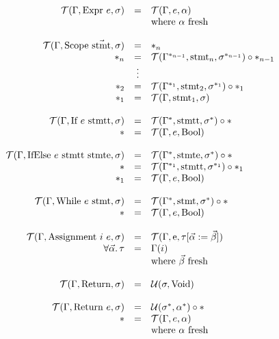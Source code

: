 \documentclass[11pt]{amsart}
\begin{document}
$\begin{array}{rcl}
	\T(\Gamma, \mbox{Expr}~e, \sigma) & = & \T(\Gamma, e, \alpha) \\
	& & \mbox{where}~\alpha~\mbox{fresh} \\

	\\

	\T(\Gamma, \mbox{Scope}~\vec{\mbox{stmt}}, \sigma) & = & \sn{n} \\
	\sn{n} & = & \T(\Gamma^{\sn{n-1}}, \mbox{stmt}_n, \sigma^{\sn{n-1}}) \circ \sn{n-1} \\
	& \vdots & \\
	\sn{2} & = & \T(\Gamma^{\sn{1}}, \mbox{stmt}_2, \sigma^{\sn{1}}) \circ \sn{1} \\
	\sn{1} & = & \T(\Gamma, \mbox{stmt}_1, \sigma) \\

	\\

	\T(\Gamma, \mbox{If}~e~\mbox{stmtt}, \sigma) & = & \T(\Gamma^{\s}, \mbox{stmtt}, \sigma^{\s}) \circ \s \\
	\s & = & \T(\Gamma, e, \mbox{Bool}) \\

	\\

	\T(\Gamma, \mbox{IfElse}~e~\mbox{stmtt}~\mbox{stmte}, \sigma) & = & \T(\Gamma^{\s}, \mbox{stmte}, \sigma^{\s}) \circ \s \\
	\s & = & \T(\Gamma^{\sn{1}}, \mbox{stmtt}, \sigma^{\sn{1}}) \circ \sn{1} \\
	\sn{1} & = & \T(\Gamma, e, \mbox{Bool}) \\

	\\

	\T(\Gamma, \mbox{While}~e~\mbox{stmt}, \sigma) & = & \T(\Gamma^{\s}, \mbox{stmt}, \sigma^{\s}) \circ \s \\
	\s & = & \T(\Gamma, e, \mbox{Bool}) \\

	\\

	\T(\Gamma, \mbox{Assignment}~i~e, \sigma) & = & \T(\Gamma, \mbox{e}, \tau [\vec{\alpha} := \vec{\beta}] ) \\
	\forall \vec{\alpha} .\, \tau & = & \Gamma(i) \\
	& & \mbox{where}~\vec{\beta}~\mbox{fresh} \\

	\\

	\T(\Gamma, \mbox{Return}, \sigma) & = & \U(\sigma, \mbox{Void}) \\

	\\

	\T(\Gamma, \mbox{Return}~e, \sigma) & = & \U(\sigma^{\s}, \alpha^{\s}) \circ \s \\
	\s & = & \T(\Gamma, e, \alpha) \\
	& & \mbox{where}~\alpha~\mbox{fresh} \\
\end{array}$
\end{document}
